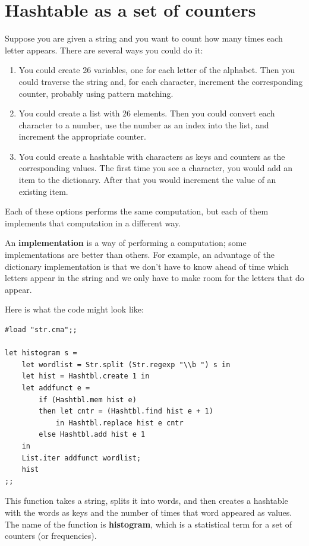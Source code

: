 \documentclass[10pt]{book}
\begin{document}
{\begin{ex}
\end{ex}


\section{Hashtable as a set of counters}
\label{histogram}


Suppose you are given a string and you want to count how many
times each letter appears.  There are several ways you could do it:

\begin{enumerate}

\item You could create 26 variables, one for each letter of the
alphabet.  Then you could traverse the string and, for each
character, increment the corresponding counter, probably using
pattern matching.

\item You could create a list with 26 elements.  Then you could
convert each character to a number, use the number as an index 
into the list, and increment the appropriate counter.

\item You could create a hashtable with characters as keys
and counters as the corresponding values.  The first time you
see a character, you would add an item to the dictionary.  After
that you would increment the value of an existing item.

\end{enumerate}

Each of these options performs the same computation, but each
of them implements that computation in a different way.


An {\bf implementation} is a way of performing a computation;
some implementations are better than others.  For example,
an advantage of the dictionary implementation is that we don't
have to know ahead of time which letters appear in the string
and we only have to make room for the letters that do appear.

Here is what the code might look like:

\beforeverb
\begin{verbatim}
#load "str.cma";;

let histogram s = 
	let wordlist = Str.split (Str.regexp "\\b ") s in
	let hist = Hashtbl.create 1 in
	let addfunct e = 
		if (Hashtbl.mem hist e)
		then let cntr = (Hashtbl.find hist e + 1)
			in Hashtbl.replace hist e cntr
		else Hashtbl.add hist e 1
	in
	List.iter addfunct wordlist;
	hist
;;
\end{verbatim}
\afterverb
%
This function takes a string, splits it into words, and then creates a 
hashtable with the words as keys and the number of times that word 
appeared as values. The name of the function is {\bf histogram}, which 
is a statistical term for a set of counters (or frequencies).

}
\end{document}
